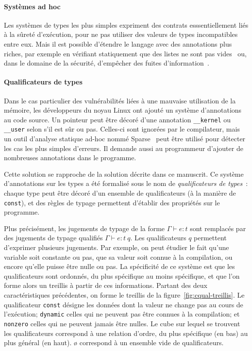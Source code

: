 \paragraph{Systèmes ad hoc}

Les systèmes de types les plus simples expriment des contrats esssentiellement
liés à la sûreté d'exécution, pour ne pas utiliser des valeurs de types
incompatibles entre eux. Mais il est possible d'étendre le langage avec des
annotations plus riches, par exemple en vérifiant statiquement que des listes ne
sont pas vides~\cite{lightweight-static-capabilities} ou, dans le domaine de la
sécurité, d'empêcher des fuites d'information~\cite{LZ06a}.

\paragraph{Qualificateurs de types}

Dans le cas particulier des vulnérabilités liées à une mauvaise utilisation de
la mémoire, les développeurs du noyau Linux ont ajouté un système d'annotations
au code source. Un pointeur peut être décoré d'une annotation
\texttt{\_\_kernel} ou \texttt{\_\_user} selon s'il est sûr ou pas. Celles-ci
sont ignorées par le compilateur, mais un outil d'analyse statique ad-hoc nommé
Sparse~ peut être utilisé pour détecter les cas les plus simples
d'erreurs. Il demande aussi au programmeur d'ajouter de nombreuses annotations
dans le programme.

Cette solution se rapproche de la solution décrite dans ce manuscrit. Ce système
d'annotations sur les types a été formalisé sous le nom de \emph{qualificateurs
de types}~\cite{toplas-quals}: chaque type peut être décoré d'un ensemble de
qualificateurs (à la manière de \texttt{const}), et des règles de typage
permettent d'établir des propriétés sur le programme.

Plus précisément, les jugements de typage de la forme $Γ ⊢ e : t$ sont remplacés
par des jugements de typage qualifiés $Γ ⊢ e : t~q$. Les qualificateurs $q$
permettent d'exprimer plusieurs jugements. Par exemple, on peut étudier le fait
qu'une variable soit constante ou pas, que sa valeur soit connue à la
compilation, ou encore qu'elle puisse être nulle ou pas. La spécificité de ce
système est que les qualificateurs sont ordonnés, du plus spécifique au moins
spécifique, et que l'on forme alors un treillis à partir de ces informations.
Partant des deux caractéristiques précédentes, on forme le treillis de la
figure~\ref{fig:cqual-treillis}. Le qualificateur \texttt{const} désigne les
données dont la valeur ne change pas au cours de l'exécution; \texttt{dynamic}
celles qui ne peuvent pas être connues à la compilation; et \texttt{nonzero}
celles qui ne peuvent jamais être nulles. Le cube sur lequel se trouvent les
qualificateurs correspond à une relation d'ordre, du plus spécifique (en bas) au
plus général (en haut). ø correspond à un ensemble vide de qualificateurs.

